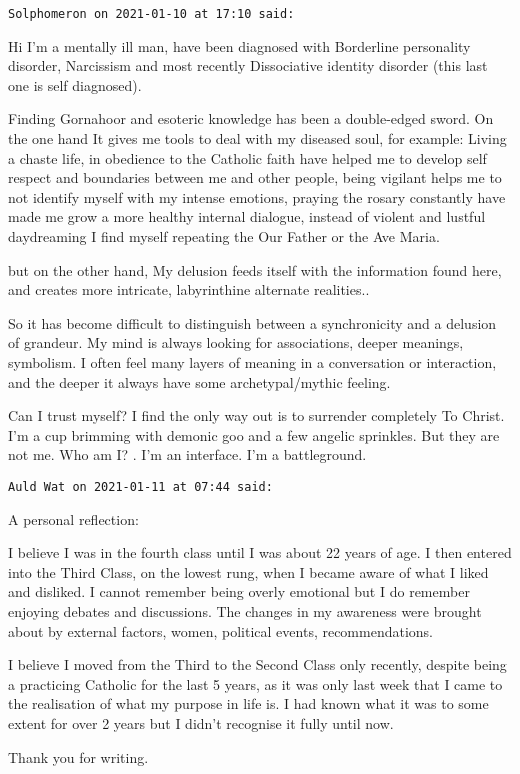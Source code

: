 \begin{footnotesize}\begin{sffamily}



\texttt{Solphomeron on 2021-01-10 at 17:10 said: }

Hi I'm a mentally ill man, have been diagnosed with Borderline personality disorder, Narcissism and most recently Dissociative identity disorder (this last one is self diagnosed).

Finding Gornahoor and esoteric knowledge has been a double-edged sword. On the one hand It gives me tools to deal with my diseased soul, for example: Living a chaste life, in obedience to the Catholic faith have helped me to develop self respect and boundaries between me and other people, being vigilant helps me to not identify myself with my intense emotions, praying the rosary constantly have made me grow a more healthy internal dialogue, instead of violent and lustful daydreaming I find myself repeating the Our Father or the Ave Maria.

but on the other hand, My delusion feeds itself with the information found here, and creates more intricate, labyrinthine alternate realities..

So it has become difficult to distinguish between a synchronicity and a delusion of grandeur. My mind is always looking for associations, deeper meanings, symbolism. I often feel many layers of meaning in a conversation or interaction, and the deeper it always have some archetypal/mythic feeling. 

Can I trust myself? I find the only way out is to surrender completely To Christ. I'm a cup brimming with demonic goo and a few angelic sprinkles. But they are not me. Who am I? . I'm an interface. I'm a battleground.

\hfill

\texttt{Auld Wat on 2021-01-11 at 07:44 said: }

A personal reflection:

I believe I was in the fourth class until I was about 22 years of age. I then entered into the Third Class, on the lowest rung, when I became aware of what I liked and disliked. I cannot remember being overly emotional but I do remember enjoying debates and discussions. The changes in my awareness were brought about by external factors, women, political events, recommendations. 

I believe I moved from the Third to the Second Class only recently, despite being a practicing Catholic for the last 5 years, as it was only last week that I came to the realisation of what my purpose in life is. I had known what it was to some extent for over 2 years but I didn't recognise it fully until now.

Thank you for writing.


\end{sffamily}\end{footnotesize}
